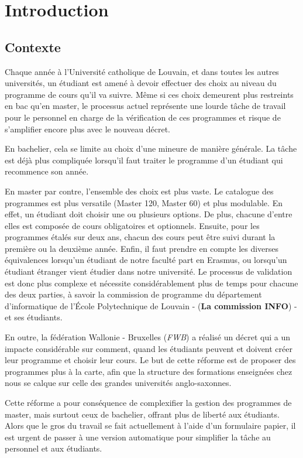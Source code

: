 \chapter{Introduction}
\label{introduction}
\section{Contexte}

Chaque année à l'Université catholique de Louvain, et dans toutes les autres universités, un étudiant est amené à devoir effectuer des choix au niveau du programme de cours qu'il va suivre. Même si ces choix demeurent plus restreints en bac qu'en master, le processus actuel représente une lourde tâche de travail pour le personnel en charge de la vérification de ces programmes et risque de s'amplifier encore plus avec le nouveau décret. 

En bachelier, cela se limite au choix d'une mineure de manière générale. La tâche est déjà plus compliquée lorsqu'il faut traiter le programme d'un étudiant qui recommence son année.

En master par contre, l'ensemble des choix est plus vaste. Le catalogue des programmes est plus versatile (Master 120, Master 60) et plus modulable. En effet, un étudiant doit choisir une ou plusieurs options. De plus, chacune d'entre elles est composée de cours obligatoires et optionnels. Ensuite, pour les programmes étalés sur deux ans, chacun des cours peut être suivi durant la première ou la deuxième année. Enfin, il faut prendre en compte les diverses équivalences lorsqu'un étudiant de notre faculté part en Erasmus, ou lorsqu'un étudiant étranger vient étudier dans notre université. Le processus de validation est donc plus complexe et nécessite considérablement plus de temps pour chacune des deux parties, à savoir la commission de programme du département d'informatique de l'École Polytechnique de Louvain - (\textbf{La commission INFO}) - et ses étudiants. 

En outre, la fédération Wallonie - Bruxelles (\textit{FWB}) a réalisé un décret qui a un impacte considérable sur comment, quand les étudiants  peuvent et doivent créer leur programme et choisir leur cours. Le but de cette réforme est de proposer des programmes plus à la carte,  afin que la structure des formations enseignées chez nous se calque sur celle des grandes universités anglo-saxonnes.

Cette réforme a pour conséquence de complexifier la gestion des programmes de master, mais surtout ceux de bachelier, offrant plus de liberté aux étudiants. Alors que le gros du travail se fait actuellement à l'aide d'un formulaire papier, il est urgent de passer à une version automatique pour simplifier la tâche au personnel et aux étudiants. 

